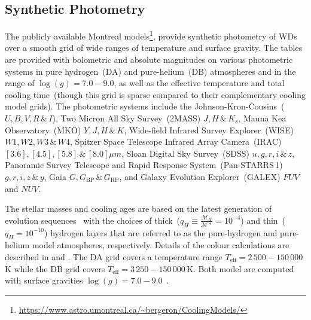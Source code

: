 \documentclass[fleqn,usenatbib]{rasti}
\begin{document}
\subsection*{Synthetic Photometry}
The publicly available Montreal models\footnote{\url{https://www.astro.umontreal.ca/~bergeron/CoolingModels/}},
provide synthetic photometry of WDs over a smooth grid of wide ranges of temperature
and surface gravity. The tables are provided with bolometric and absolute
magnitudes on various photometric systems in pure hydrogen~(DA) and pure-helium~(DB)
atmospheres and in the range of $\log(g)=7.0 - 9.0$, as well as
the effective temperature and total cooling time~(though this grid is sparse
compared to their complementary cooling model grids). The
photometric systems include the Johnson-Kron-Cousins~($U, B, V, R\,\&\,I$),
Two Micron All Sky Survey~(2MASS) $J, H\,\&\,K_{s}$, Mauna Kea Observatory~(MKO)
$Y, J, H\,\&\,K$, Wide-field Infrared Survey Explorer~(WISE) $W1, W2, W3\,\&\,W4$,
Spitzer Space Telescope Infrared Array Camera~(IRAC)
$[3.6], [4.5], [5.8]\,\&\,[8.0] \mu m$, Sloan Digital Sky Survey~(SDSS)
$u, g, r, i\,\&\,z$, Panoramic Survey Telescope and Rapid Response
System~(Pan-STARRS\,1) $g, r, i, z\,\&\,y$,
Gaia $G, G_{\mathrm{BP}}\,\&\,G_{\mathrm{RP}}$, and Galaxy Evolution
Explorer~(GALEX) $FUV$ and $NUV$.

The stellar masses and cooling ages are based on the latest generation of
evolution sequences~\citep{2020ApJ...901...93B} with the choices of
thick~($q_H \equiv \frac{\mathcal{M}_H}{\mathcal{M}*} = 10^{-4}$) and thin~($q_H = 10^{-10}$)
hydrogen layers that are referred to as the pure-hydrogen and
pure-helium model atmospheres, respectively. Details of the colour calculations
are described in \citet{1995PASP..107.1047B} and \citet{2006AJ....132.1221H}.
The DA grid covers a temperature range $T_{\mathrm{eff}} = 2\,500 - 150\,000$\,K
while the DB grid covers $T_{\mathrm{eff}} = 3\,250 - 150\,000$\,K. Both model
are computed with surface gravities $\log(g) = 7.0 - 9.0$~\citep{
2018ApJ...863..184B, 2020ApJ...901...93B, 2011ApJ...730..128T,
2011ApJ...737...28B, 2006ApJ...651L.137K}.
\end{document}
